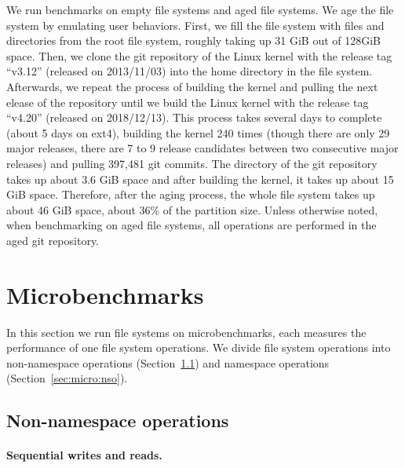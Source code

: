We run benchmarks on empty file systems and aged file systems.
We age the file system by emulating user behaviors.
First, we fill the file system with files and directories from the root file
system, roughly taking up 31 GiB out of 128GiB space.
Then, we clone the git repository of the Linux kernel with the release tag
``v3.12'' (released on 2013/11/03) into the home directory in the file system.
Afterwards, we repeat the process of building the kernel and pulling the next
elease of the repository
until we build the Linux kernel with the release tag ``v4.20''
(released on 2018/12/13).
This process takes several days to complete (about 5 days on ext4),
building the kernel 240 times
(though there are only 29 major releases, there are 7 to 9 release candidates
between two consecutive major releases)
and pulling 397,481 git commits.
The directory of the git repository takes up about 3.6 GiB space and
after building the kernel, it takes up about 15 GiB space.
Therefore, after the aging process, the whole file system takes up about 46 GiB
space, about 36\% of the partition size.
Unless otherwise noted, when benchmarking on aged file systems,
all operations are performed in the aged git repository.

\section{Microbenchmarks}
\label{sec:micro}

In this section we run file systems on microbenchmarks,
each measures the performance of one file system operations.
We divide file system operations into non-namespace operations
(Section~\ref{sec:micro:nnso})
and namespace operations (Section~\ref{sec:micro:nso}).

\subsection{Non-namespace operations}
\label{sec:micro:nnso}

\paragraph{Sequential writes and reads.}


